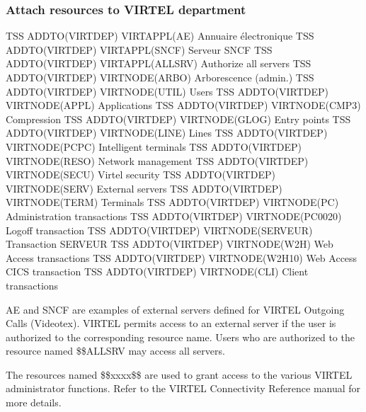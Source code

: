 \documentclass[letterpaper,10pt,english]{sphinxmanual}
\begin{document}
\subsubsection{Attach resources to VIRTEL department}
\label{\detokenize{Installation_Guide:attach-resources-to-virtel-department}}
\begin{sphinxVerbatim}[commandchars=\\\{\}]
TSS ADDTO(VIRTDEP) VIRTAPPL(AE) Annuaire électronique
TSS ADDTO(VIRTDEP) VIRTAPPL(SNCF) Serveur SNCF
TSS ADDTO(VIRTDEP) VIRTAPPL(\PYGZdl{}\PYGZdl{}ALLSRV) Authorize all servers
TSS ADDTO(VIRTDEP) VIRTNODE(\PYGZdl{}\PYGZdl{}ARBO\PYGZdl{}\PYGZdl{}) Arborescence (admin.)
TSS ADDTO(VIRTDEP) VIRTNODE(\PYGZdl{}\PYGZdl{}UTIL\PYGZdl{}\PYGZdl{}) Users
TSS ADDTO(VIRTDEP) VIRTNODE(\PYGZdl{}\PYGZdl{}APPL\PYGZdl{}\PYGZdl{}) Applications
TSS ADDTO(VIRTDEP) VIRTNODE(\PYGZdl{}\PYGZdl{}CMP3\PYGZdl{}\PYGZdl{}) Compression
TSS ADDTO(VIRTDEP) VIRTNODE(\PYGZdl{}\PYGZdl{}GLOG\PYGZdl{}\PYGZdl{}) Entry points
TSS ADDTO(VIRTDEP) VIRTNODE(\PYGZdl{}\PYGZdl{}LINE\PYGZdl{}\PYGZdl{}) Lines
TSS ADDTO(VIRTDEP) VIRTNODE(\PYGZdl{}\PYGZdl{}PCPC\PYGZdl{}\PYGZdl{}) Intelligent terminals
TSS ADDTO(VIRTDEP) VIRTNODE(\PYGZdl{}\PYGZdl{}RESO\PYGZdl{}\PYGZdl{}) Network management
TSS ADDTO(VIRTDEP) VIRTNODE(\PYGZdl{}\PYGZdl{}SECU\PYGZdl{}\PYGZdl{}) Virtel security
TSS ADDTO(VIRTDEP) VIRTNODE(\PYGZdl{}\PYGZdl{}SERV\PYGZdl{}\PYGZdl{}) External servers
TSS ADDTO(VIRTDEP) VIRTNODE(\PYGZdl{}\PYGZdl{}TERM\PYGZdl{}\PYGZdl{}) Terminals
TSS ADDTO(VIRTDEP) VIRTNODE(PC) Administration transactions
TSS ADDTO(VIRTDEP) VIRTNODE(PC\PYGZhy{}0020) Logoff transaction
TSS ADDTO(VIRTDEP) VIRTNODE(SERVEUR) Transaction SERVEUR
TSS ADDTO(VIRTDEP) VIRTNODE(W2H) Web Access transactions
TSS ADDTO(VIRTDEP) VIRTNODE(W2H\PYGZhy{}10) Web Access CICS transaction
TSS ADDTO(VIRTDEP) VIRTNODE(CLI) Client transactions
\end{sphinxVerbatim}


AE and SNCF are examples of external servers defined for VIRTEL Outgoing Calls (Videotex). VIRTEL permits access to an external server if the user is authorized to the corresponding resource name. Users who are authorized to the resource named \$\$ALLSRV may access all servers.

The resources named \$\$xxxx\$\$ are used to grant access to the various VIRTEL administrator functions. Refer to the VIRTEL Connectivity Reference manual for more details.
\end{document}
